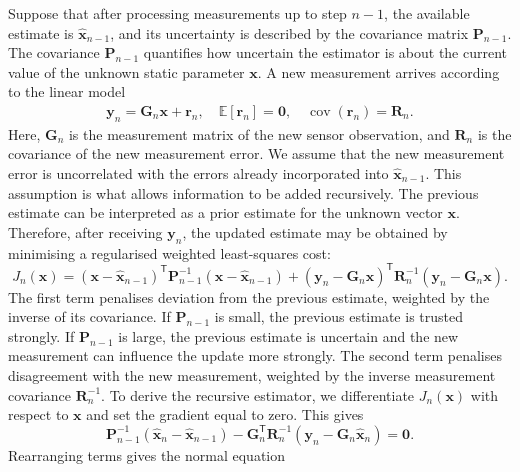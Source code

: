 Suppose that after processing measurements up to step $n-1$, the available estimate is $\widehat{\mathbf{x}}_{n-1}$, and its uncertainty is described by the covariance matrix $\mathbf{P}_{n-1}$. The covariance $\mathbf{P}_{n-1}$ quantifies how uncertain the estimator is about the current value of the unknown static parameter $\mathbf{x}$. A new measurement arrives according to the linear model
\begin{align*}
\mathbf{y}_n
=
\mathbf{G}_n\mathbf{x}
+
\mathbf{r}_n,
\quad
\mathbb{E}[\mathbf{r}_n]=\mathbf{0},
\quad
\operatorname{cov}(\mathbf{r}_n)=\mathbf{R}_n.
\end{align*}
Here, $\mathbf{G}_n$ is the measurement matrix of the new sensor observation, and $\mathbf{R}_n$ is the covariance of the new measurement error. We assume that the new measurement error is uncorrelated with the errors already incorporated into $\widehat{\mathbf{x}}_{n-1}$. This assumption is what allows information to be added recursively. The previous estimate can be interpreted as a prior estimate for the unknown vector $\mathbf{x}$. Therefore, after receiving $\mathbf{y}_n$, the updated estimate may be obtained by minimising a regularised weighted least-squares cost:
\begin{equation}
J_n(\mathbf{x}) = \left( \mathbf{x} - \widehat{\mathbf{x}}_{n-1} \right)^{\mathsf T} \mathbf{P}_{n-1}^{-1} \left( \mathbf{x} - \widehat{\mathbf{x}}_{n-1} \right) + \left( \mathbf{y}_n - \mathbf{G}_n\mathbf{x} \right)^{\mathsf T} \mathbf{R}_n^{-1} \left( \mathbf{y}_n - \mathbf{G}_n\mathbf{x} \right).
\end{equation}
The first term penalises deviation from the previous estimate, weighted by the inverse of its covariance. If $\mathbf{P}_{n-1}$ is small, the previous estimate is trusted strongly. If $\mathbf{P}_{n-1}$ is large, the previous estimate is uncertain and the new measurement can influence the update more strongly. The second term penalises disagreement with the new measurement, weighted by the inverse measurement covariance $\mathbf{R}_n^{-1}$. To derive the recursive estimator, we differentiate $J_n(\mathbf{x})$ with respect to $\mathbf{x}$ and set the gradient equal to zero. This gives
\begin{equation}
\mathbf{P}_{n-1}^{-1}
\left(
\widehat{\mathbf{x}}_n
-
\widehat{\mathbf{x}}_{n-1}
\right)
-
\mathbf{G}_n^{\mathsf T}
\mathbf{R}_n^{-1}
\left(
\mathbf{y}_n
-
\mathbf{G}_n
\widehat{\mathbf{x}}_n
\right)
=
\mathbf{0}.
\end{equation}
Rearranging terms gives the normal equation
